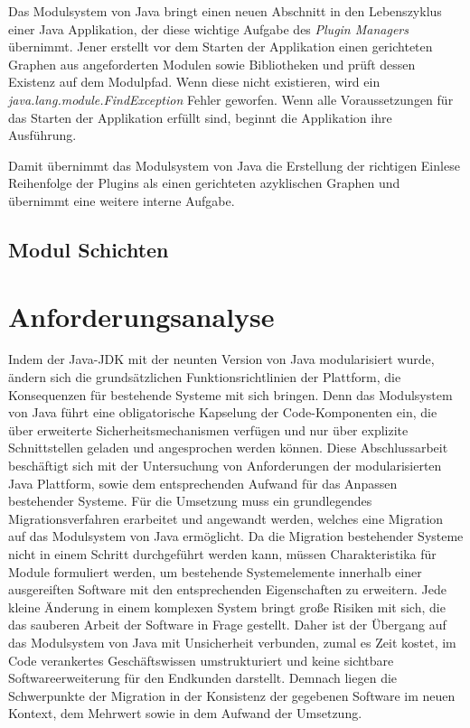 		Das Modulsystem von Java bringt einen neuen Abschnitt in den Lebenszyklus einer Java Applikation, der diese wichtige Aufgabe des \textit{Plugin Managers} übernimmt. Jener erstellt vor dem Starten der Applikation einen gerichteten Graphen aus angeforderten Modulen sowie Bibliotheken und prüft dessen Existenz auf dem Modulpfad. Wenn diese nicht existieren, wird ein \textit{java.lang.module.FindException} Fehler geworfen. Wenn alle Voraussetzungen für das Starten der Applikation erfüllt sind, beginnt die Applikation ihre Ausführung. \bigbreak

		Damit übernimmt das Modulsystem von Java die Erstellung der richtigen Einlese Reihenfolge der Plugins als einen gerichteten azyklischen Graphen und übernimmt eine weitere interne Aufgabe.
	\subsection{Modul Schichten}\label{sub:module_layer}
	
\section{Anforderungsanalyse} 
	Indem der Java-JDK mit der neunten Version von Java modularisiert wurde, ändern sich die grundsätzlichen Funktionsrichtlinien der Plattform, die Konsequenzen für bestehende Systeme mit sich bringen. Denn das Modulsystem von Java führt eine obligatorische Kapselung der Code-Komponenten ein, die über erweiterte Sicherheitsmechanismen verfügen und nur über explizite Schnittstellen geladen und angesprochen werden können.\newline 
	Diese Abschlussarbeit beschäftigt sich mit der Untersuchung von Anforderungen der modularisierten Java Plattform, sowie dem entsprechenden Aufwand für das Anpassen bestehender Systeme. \newline
	Für die Umsetzung muss ein grundlegendes Migrationsverfahren erarbeitet und angewandt werden, welches eine Migration auf das Modulsystem von Java ermöglicht. Da die Migration bestehender Systeme nicht in einem Schritt durchgeführt werden kann, müssen Charakteristika für Module formuliert werden, um bestehende Systemelemente innerhalb einer ausgereiften Software mit den entsprechenden Eigenschaften zu erweitern.\newline
	Jede kleine Änderung in einem komplexen System bringt große Risiken mit sich, die das sauberen Arbeit der Software in Frage gestellt. Daher ist der Übergang auf das Modulsystem von Java mit Unsicherheit verbunden, zumal es Zeit kostet, im Code verankertes Geschäftswissen umstrukturiert und keine sichtbare Softwareerweiterung für den Endkunden darstellt. Demnach liegen die Schwerpunkte der Migration in der Konsistenz der gegebenen Software im neuen Kontext, dem Mehrwert sowie in dem Aufwand der Umsetzung. \bigbreak

